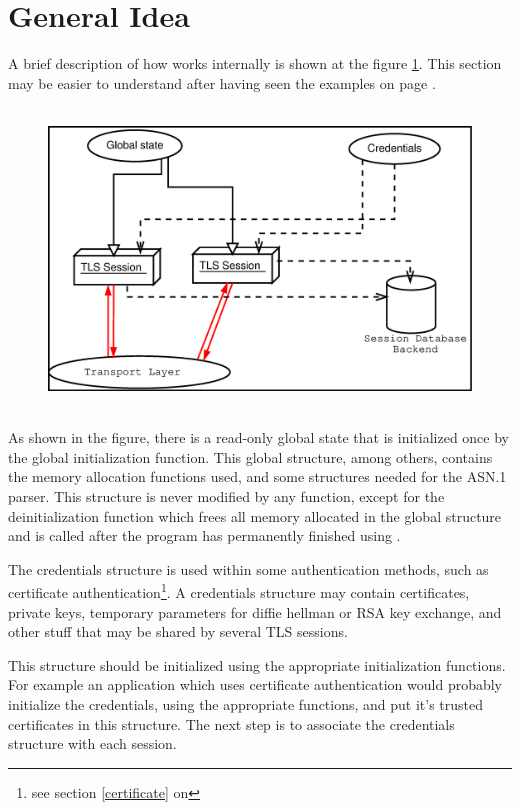 \section{General Idea}
A brief description of how \gnutls{} works internally is shown at
the figure \ref{fig:internals}. This section may be easier to understand
after having seen the examples on page \pageref{examples}.

\begin{figure}[htp]
\includegraphics[height=8cm,width=12cm]{internals}
\label{fig:internals}
\end{figure}

\par
As shown in the figure, there is a read-only global state that
is initialized once by the global initialization function.
This global structure, among others, contains the memory allocation
functions used, and some structures needed for the ASN.1 parser.
This structure is never modified by any \gnutls{} function, except
for the deinitialization function which frees all memory allocated in
the global structure and is called after the program has permanently finished 
using \gnutls{}.

\par
The credentials structure is used within some authentication methods,
such as certificate authentication\footnote{see section \ref{certificate} on \pageref{certificate}}.
A credentials structure may contain certificates, private keys, temporary parameters 
for diffie hellman or RSA key exchange, and other stuff that may be shared
by several TLS sessions. 

This structure should be initialized using the appropriate initialization
functions. For example an application which uses certificate authentication
would probably initialize the credentials, using the appropriate functions,
and put it's trusted certificates in this structure. The next step is to
associate the credentials structure with each \tls{} session.

